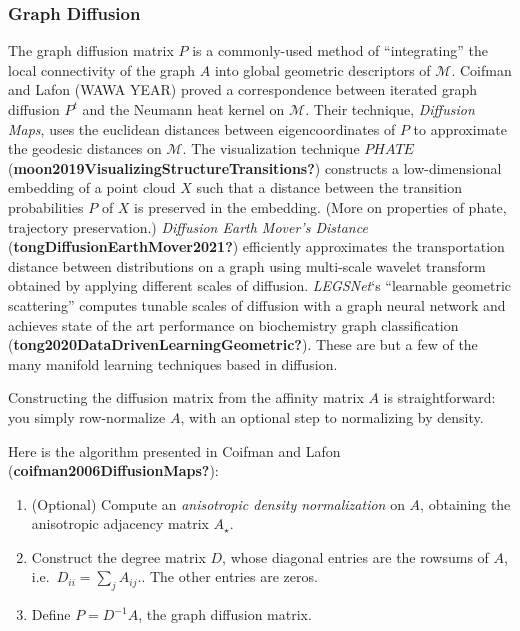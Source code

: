 \documentclass[
  letterpaper,
  DIV=11,
  numbers=noendperiod]{scrartcl}
\providecommand{\tightlist}{%
  \setlength{\itemsep}{0pt}\setlength{\parskip}{0pt}}\usepackage{longtable,booktabs,array}
\begin{document}
\subsubsection{Graph Diffusion}\label{graph-diffusion}

The graph diffusion matrix \(P\) is a commonly-used method of
``integrating'' the local connectivity of the graph \(A\) into global
geometric descriptors of \(\mathcal{M}\). Coifman and Lafon (WAWA YEAR)
proved a correspondence between iterated graph diffusion \(P^t\) and the
Neumann heat kernel on \(\mathcal{M}\). Their technique, \emph{Diffusion
Maps}, uses the euclidean distances between eigencoordinates of \(P\) to
approximate the geodesic distances on \(\mathcal{M}\). The visualization
technique \(PHATE\) (\textbf{moon2019VisualizingStructureTransitions?})
constructs a low-dimensional embedding of a point cloud \(X\) such that
a distance between the transition probabilities \(P\) of \(X\) is
preserved in the embedding. (More on properties of phate, trajectory
preservation.) \emph{Diffusion Earth Mover's Distance}
(\textbf{tongDiffusionEarthMover2021?}) efficiently approximates the
transportation distance between distributions on a graph using
multi-scale wavelet transform obtained by applying different scales of
diffusion. \emph{LEGSNet}`s ``learnable geometric scattering'' computes
tunable scales of diffusion with a graph neural network and achieves
state of the art performance on biochemistry graph classification
(\textbf{tong2020DataDrivenLearningGeometric?}). These are but a few of
the many manifold learning techniques based in diffusion.

Constructing the diffusion matrix from the affinity matrix \(A\) is
straightforward: you simply row-normalize \(A\), with an optional step
to normalizing by density.

Here is the algorithm presented in Coifman and Lafon
(\textbf{coifman2006DiffusionMaps?}):

\begin{enumerate}
\def\labelenumi{\arabic{enumi}.}
\tightlist
\item
  (Optional) Compute an \emph{anisotropic density normalization} on
  \(A\), obtaining the anisotropic adjacency matrix \(A_{\star}\).
\item
  Construct the degree matrix \(D\), whose diagonal entries are the
  rowsums of \(A\), i.e.~\(D_{ii} = \sum_{j}A_{ij}\).. The other entries
  are zeros.
\item
  Define \(P = D^{-1} A\), the graph diffusion matrix.
\end{enumerate}
\end{document}
